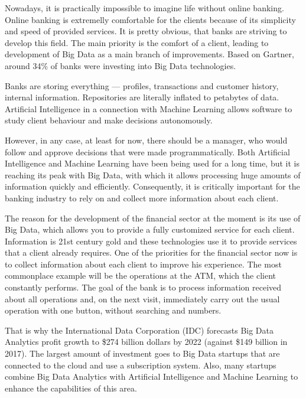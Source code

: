 
Nowadays, it is practically impossible to imagine life without online banking.
Online banking is extremelly comfortable for the clients because of its simplicity and speed of provided services.
It is pretty obvious, that banks are striving to develop this field.
The main priority is the comfort of a client, leading to development of Big Data as a main branch of improvements.
Based on Gartner, around 34\% of banks were investing into Big Data technologies.

Banks are storing everything — profiles, transactions and customer history, internal information.
Repositories are literally inflated to petabytes of data.
Artificial Intelligence in a connection with Machine Learning allows software to study client behaviour and make decisions autonomously.

However, in any case, at least for now, there should be a manager, who would follow and approve decisions that were made programmatically.
Both Artificial Intelligence and Machine Learning have been being used for a long time, 
but it is reaching its peak with Big Data, with which it allows processing huge amounts of information quickly and efficiently.
Consequently, it is critically important for the banking industry to rely on and collect more information about each client. 

The reason for the development of the financial sector at the moment is its use of Big Data,
which allows you to provide a fully customized service for each client.
Information is 21st century gold and these technologies use it to provide services that a client already requires.
One of the priorities for the financial sector now is to collect information about each client to improve his experience.
The most commonplace example will be the operations at the ATM, which the client constantly performs.
The goal of the bank is to process information received about all operations and, on the next visit, 
immediately carry out the usual operation with one button, without searching and numbers.

That is why the International Data Corporation (IDC) forecasts Big Data Analytics profit growth to 
\$274 billion dollars by 2022 (against \$149 billion in 2017).
\cite{big_data_revenue_forecast}
The largest amount of investment goes to Big Data startups that are connected to the cloud and use a subscription system.
Also, many startups combine Big Data Analytics with Artificial Intelligence and Machine Learning 
to enhance the capabilities of this area. 

